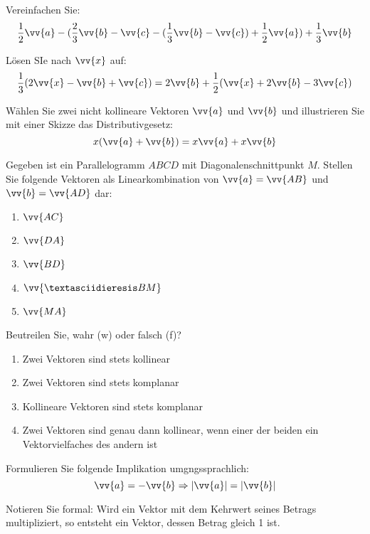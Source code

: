 \begin{exercisesKapitel}


\begin{exercise}
Vereinfachen Sie:
\[ \frac{1}{2} \vv{a} - ( \frac{2}{3} \vv{b} - \vv{c} - ( \frac{1}{3} \vv{b} - \vv{c}) + \frac{1}{2} \vv{a})+ \frac{1}{3} \vv{b} \]
\end{exercise}

\begin{exercise}
Lösen SIe nach $\vv{x}$ auf:
\[ \frac{1}{3} ( 2\vv{x}-\vv{b}+\vv{c})=2\vv{b}+\frac{1}{2}(\vv{x}+2\vv{b}-3\vv{c})\]
\end{exercise}

\begin{exercise}
Wählen Sie zwei nicht kollineare Vektoren $\vv{a}$ und $\vv{b}$ und illustrieren Sie mit einer Skizze das Distributivgesetz:
\[x (\vv{a} + \vv{b}) = x \vv{a} + x \vv{b} \]
\end{exercise}

\begin{exercise}
Gegeben ist ein Parallelogramm $ABCD$ mit Diagonalenschnittpunkt $M$. Stellen Sie folgende Vektoren als Linearkombination von $\vv{a} = \vv{AB}$ und $\vv{b} = \vv{AD}$ dar:
\begin{enumerate}
\item $\vv{AC}$
\item $\vv{DA}$
\item $\vv{BD}$
\item $\vv{¨BM}$
\item $\vv{MA}$
\end{enumerate}
\end{exercise}


\begin{exercise}
Beutreilen Sie, wahr (w) oder falsch (f)?
\begin{enumerate}
\item Zwei Vektoren sind stets kollinear
\item Zwei Vektoren sind stets komplanar
\item Kollineare Vektoren sind stets komplanar
\item Zwei Vektoren sind genau dann kollinear, wenn einer der beiden ein Vektorvielfaches des andern ist
\end{enumerate}
\end{exercise}

\begin{exercise}
Formulieren Sie folgende Implikation umgngssprachlich:
\[ \vv{a} = -\vv{b} \Rightarrow |\vv{a}| = |\vv{b}|\]
\end{exercise}

\begin{exercise}
Notieren Sie formal:
Wird ein Vektor mit dem Kehrwert seines Betrags multipliziert, so entsteht ein Vektor, dessen Betrag gleich 1 ist.
\end{exercise}

\end{exercisesKapitel}

